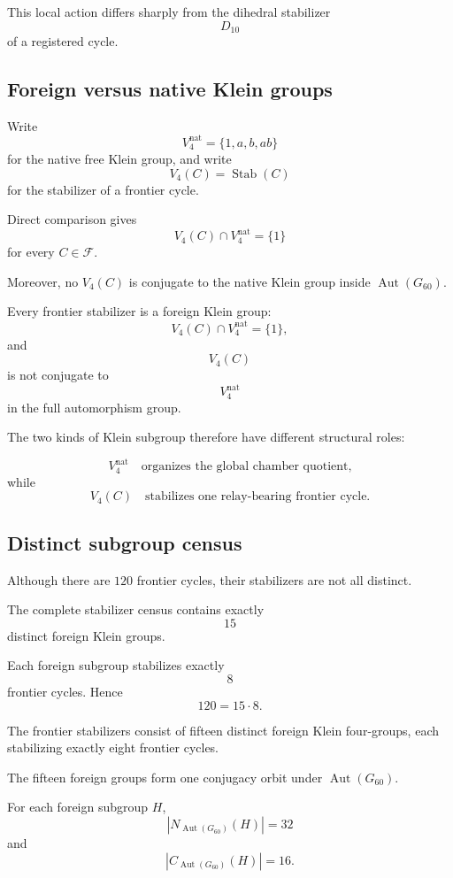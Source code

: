 This local action differs sharply from the dihedral stabilizer
\[
D_{10}
\]
of a registered cycle.

\subsection{Foreign versus native Klein groups}

Write
\[
V_4^{\mathrm{nat}}
=
\{1,a,b,ab\}
\]
for the native free Klein group, and write
\[
V_4(C)=\operatorname{Stab}(C)
\]
for the stabilizer of a frontier cycle.

Direct comparison gives
\[
V_4(C)\cap V_4^{\mathrm{nat}}
=
\{1\}
\]
for every \(C\in\mathcal F\).

Moreover, no \(V_4(C)\) is conjugate to the native Klein group inside
\(\operatorname{Aut}(G_{60})\).

\begin{theorem}
Every frontier stabilizer is a foreign Klein group:
\[
V_4(C)\cap V_4^{\mathrm{nat}}=\{1\},
\]
and
\[
V_4(C)
\]
is not conjugate to
\[
V_4^{\mathrm{nat}}
\]
in the full automorphism group.
\end{theorem}

The two kinds of Klein subgroup therefore have different structural
roles:

\[
V_4^{\mathrm{nat}}
\quad\text{organizes the global chamber quotient,}
\]
while
\[
V_4(C)
\quad\text{stabilizes one relay-bearing frontier cycle.}
\]

\subsection{Distinct subgroup census}

Although there are \(120\) frontier cycles, their stabilizers are not
all distinct.

The complete stabilizer census contains exactly
\[
15
\]
distinct foreign Klein groups.

Each foreign subgroup stabilizes exactly
\[
8
\]
frontier cycles. Hence
\[
120=15\cdot8.
\]

\begin{theorem}
The frontier stabilizers consist of fifteen distinct foreign Klein
four-groups, each stabilizing exactly eight frontier cycles.
\end{theorem}

The fifteen foreign groups form one conjugacy orbit under
\(\operatorname{Aut}(G_{60})\).

For each foreign subgroup \(H\),
\[
|N_{\operatorname{Aut}(G_{60})}(H)|=32
\]
and
\[
|C_{\operatorname{Aut}(G_{60})}(H)|=16.
\]

